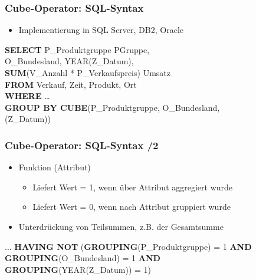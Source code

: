     \begin{frame}
    
    \frametitle{Cube-Operator: SQL-Syntax}
    \begin{itemize}
    \item Implementierung in SQL Server, DB2, Oracle
    \end{itemize}
    
    \begin{sql}
        \textbf{SELECT} P\_Produktgruppe  PGruppe,\\
     \1 O\_Bundesland, YEAR(Z\_Datum),\\
     \1 \textbf{SUM}(V\_Anzahl * P\_Verkaufspreis)  Umsatz\\
        \textbf{FROM} Verkauf, Zeit, Produkt, Ort\\
        \textbf{WHERE} \dots \\
        \textbf{GROUP BY CUBE}(P\_Produktgruppe, O\_Bundesland, \\
    \1 (Z\_Datum))
      \end{sql}
    
    \end{frame}
    
      \begin{frame}
    
        \frametitle{Cube-Operator: SQL-Syntax /2}
        \begin{itemize}
    \item Funktion (Attribut)
      \begin{itemize}
      \item Liefert Wert = 1, wenn über Attribut aggregiert wurde
      \item Liefert Wert = 0, wenn nach Attribut gruppiert wurde
      \end{itemize}
    \item Unterdrückung von Teilsummen, z.B. der Gesamtsumme
    \end{itemize}
    
    \begin{sql}
        ... \textbf{HAVING NOT} (\=
        \textbf{GROUPING}(P\_Produktgruppe) = 1 \textbf{AND}\\
        \1  \textbf{GROUPING}(O\_Bundesland) = 1 \textbf{AND}\\
        \1 \textbf{GROUPING}(YEAR(Z\_Datum)) = 1)
    \end{sql}
    
    \end{frame}
    
